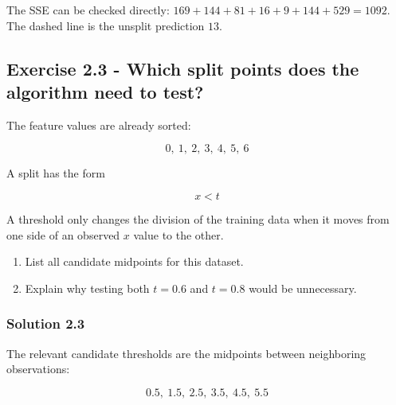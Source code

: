 \documentclass[10pt]{article}
\begin{document}
The SSE can be checked directly: $169+144+81+16+9+144+529=1092$. The dashed line is the unsplit prediction $13$.
\begin{center}
\end{center}
\par\endgroup

\subsection*{Exercise 2.3 - Which split points does the algorithm need to test?}
The feature values are already sorted:

\[
0,\ 1,\ 2,\ 3,\ 4,\ 5,\ 6
\]

A split has the form

\[
x<t
\]

A threshold only changes the division of the training data when it moves from one side of an observed $x$ value to the other.

\begin{enumerate}
\item
List all candidate midpoints for this dataset.

\item
Explain why testing both $t=0.6$ and $t=0.8$ would be unnecessary.

\end{enumerate}
\begingroup\color{red}

\subsubsection*{Solution 2.3}
The relevant candidate thresholds are the midpoints between neighboring
observations:

\[
0.5,\ 1.5,\ 2.5,\ 3.5,\ 4.5,\ 5.5
\]
\end{document}

